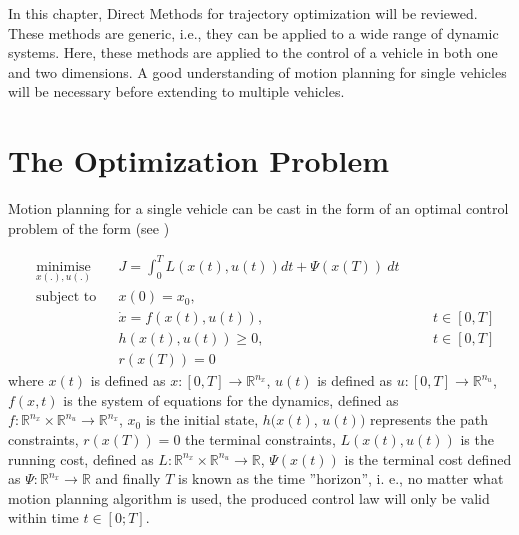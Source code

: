 %
\cleardoublepage%
\label{chap:theory}

\par In this chapter, Direct Methods for trajectory optimization will be reviewed. These methods are generic, i.e., they can be applied to a wide range of dynamic systems. Here, these methods are applied to the control of a vehicle in both one and two dimensions. A good understanding of motion planning for single vehicles will be necessary before extending to multiple vehicles.

\section{The Optimization Problem}
\label{sec:optimprob_intro}

\par Motion planning for a single vehicle can be cast in the form of an optimal control problem of the form (see \cite{diehl2006fast})

\begin{equation}
    \begin{aligned}
    & \underset{x(.),u(.)}{\text{minimise}} && J = \int_0^T L(x(t),u(t))dt + \Psi (x(T)) \ dt\\
    & \text{subject to}  && x(0) = x_0, \\
        & && \dot{x} = f(x(t), u(t)), &&& t \in [0,T] \\ %
        & && h(x(t),u(t)) \geq 0, &&&  t \in [0,T] \\ %
        & && r(x(T)) = 0 %
    \end{aligned}
    \label{eq:general_cost}
\end{equation}
where $x(t)$ is defined as $x:[0,T]\rightarrow \mathbb{R}^{n_x}$, $u(t)$ is defined as $u:[0,T]\rightarrow \mathbb{R}^{n_u}$, $f(x,t)$ is the system of equations for the dynamics, defined as $f:\mathbb{R}^{n_x}\times \mathbb{R}^{n_u}\rightarrow \mathbb{R}^{n_x}$, $x_0$ is the initial state, $h(x(t)$, $u(t))$ represents the path constraints, $r(x(T))=0$ the terminal constraints, $L(x(t),u(t))$ is the running cost, defined as $L:\mathbb{R}^{n_x}\times \mathbb{R}^{n_u}\rightarrow \mathbb{R}$, $\Psi(x(t))$ is the terminal cost defined as $\Psi:\mathbb{R}^{n_x} \rightarrow \mathbb{R}$ and finally $T$ is known as the time ”horizon”, i. e., no matter what motion planning algorithm is used, the produced control law will only be valid within time $t\in[0;T]$.

